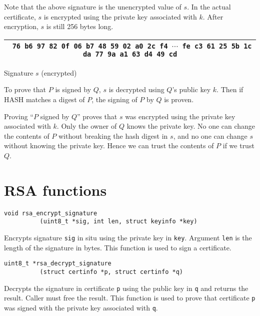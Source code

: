 \documentclass[12pt]{article}
\begin{document}
\bigskip
\noindent
Note that the above signature is the unencrypted value of $s$.
In the actual certificate, $s$ is encrypted using the private key associated with $k$.
After encryption, $s$ is still 256 bytes long.

\begin{center}
\begin{tabular}{|c|}
\hline
{\footnotesize\tt
76 b6 97 82 0f 06 b7 48 59 02 a0 2c f4 $\cdots$
fe c3 61 25 5b 1c da 77 9a a1 63 d4 49 cd}\\
\hline
\end{tabular}

\medskip
Signature $s$ (encrypted)
\end{center}

\noindent
To prove that $P$ is signed by $Q$, $s$ is decrypted using $Q$'s public key $k$.
Then if HASH matches a digest of $P$, the signing of $P$ by $Q$ is proven.

\bigskip
\noindent
Proving ``$P$ signed by $Q$'' proves that $s$ was encrypted using the private key associated with $k$.
Only the owner of $Q$ knows the private key.
No one can change the contents of $P$ without breaking the hash digest in $s$,
and no one can change $s$ without knowing the private key.
Hence we can trust the contents of $P$ if we trust $Q$.

\newpage
\section{RSA functions}

\bigskip
\bigskip
\begin{verbatim}
void rsa_encrypt_signature
          (uint8_t *sig, int len, struct keyinfo *key)
\end{verbatim}

\noindent
Encrypts signature {\tt sig} in situ using the private key in {\tt key}.
Argument {\tt len} is the length of the signature in bytes.
This function is used to sign a certificate.

\bigskip
\bigskip
\begin{verbatim}
uint8_t *rsa_decrypt_signature
          (struct certinfo *p, struct certinfo *q)
\end{verbatim}

\noindent
Decrypts the signature in certificate {\tt p} using the public key in {\tt q} and returns the result.
Caller must free the result.
This function is used to prove that certificate {\tt p}
was signed with the private key associated with {\tt q}.
\end{document}
